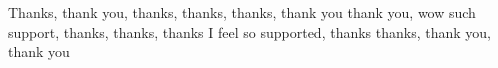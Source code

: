 Thanks, thank you, thanks, thanks, thanks, thank you thank you, wow such support, thanks, thanks, thanks I feel so supported, thanks thanks, thank you, thank you
